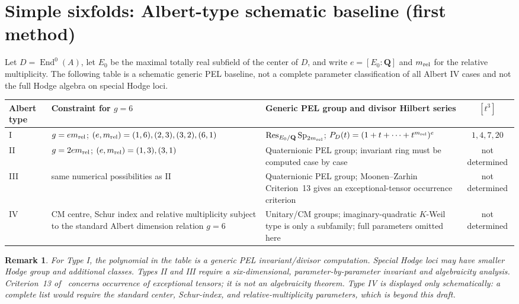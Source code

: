 \documentclass[11pt]{article}
\newtheorem{remark}[theorem]{Remark}
\newcommand{\Q}{\mathbf Q}
\newcommand{\End}{\operatorname{End}}
\newcommand{\Sp}{\operatorname{Sp}}
\newcommand{\Res}{\operatorname{Res}}
\begin{document}
\section{Simple sixfolds: Albert-type schematic baseline (first method)}
Let $D=\End^0(A)$, let $E_0$ be the maximal totally real subfield of the center of $D$, and write $e=[E_0:\Q]$ and $m_{\rm rel}$ for the relative multiplicity.  The following table is a schematic generic PEL baseline, not a complete parameter classification of all Albert IV cases and not the full Hodge algebra on special Hodge loci.

\begin{center}
\small
\begin{tabular}{>{\raggedright\arraybackslash}p{} >{\raggedright\arraybackslash}p{} >{\raggedright\arraybackslash}p{} c}
\toprule
Albert type & Constraint for $g=6$ & Generic PEL group and divisor Hilbert series & $[t^3]$\\
\midrule
I & $g=e m_{\rm rel}$; $(e,m_{\rm rel})=(1,6),(2,3),(3,2),(6,1)$ & $\Res_{E_0/\Q}\Sp_{2m_{\rm rel}}$; $P_D(t)=(1+t+\cdots+t^{m_{\rm rel}})^e$ & $1,4,7,20$\\
II & $g=2e m_{\rm rel}$; $(e,m_{\rm rel})=(1,3),(3,1)$ & Quaternionic PEL group; invariant ring must be computed case by case & not determined\\
III & same numerical possibilities as II & Quaternionic PEL group; Moonen--Zarhin Criterion~13 gives an exceptional-tensor occurrence criterion & not determined\\
IV & CM centre, Schur index and relative multiplicity subject to the standard Albert dimension relation $g=6$ & Unitary/CM groups; imaginary-quadratic $K$-Weil type is only a subfamily; full parameters omitted here & not determined\\
\bottomrule
\end{tabular}
\end{center}

\begin{remark}
For Type I, the polynomial in the table is a \emph{generic PEL invariant/divisor} computation.  Special Hodge loci may have smaller Hodge group and additional classes.  Types II and III require a six-dimensional, parameter-by-parameter invariant and algebraicity analysis.  Criterion~13 of~\cite{MZweil} concerns occurrence of exceptional tensors; it is not an algebraicity theorem.  Type IV is displayed only schematically: a complete list would require the standard center, Schur-index, and relative-multiplicity parameters, which is beyond this draft.
\end{remark}
\end{document}
